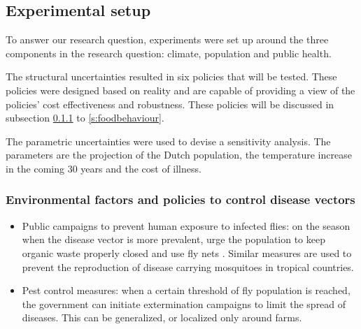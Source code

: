 \subsection{Experimental setup}
  

To answer our research question, experiments were set up around the three components in the research question: climate, population and public health. 

The structural uncertainties resulted in six policies that will be tested. These policies were designed based on reality and are capable of providing a view of the policies' cost effectiveness and robustness. These policies will be discussed in subsection \ref{s:environmentalfactors} to \ref{s:foodbehaviour}. 

The parametric uncertainties were used to devise a sensitivity analysis. The parameters are the projection of the Dutch population, the temperature increase in the coming 30 years and the cost of illness. 

\subsubsection{Environmental factors and policies to control disease vectors}
\label{s:environmentalfactors}
\begin{itemize}
    \item Public campaigns to prevent human exposure to infected flies: on the season when the disease vector is more prevalent, urge the population to keep organic waste properly closed and use fly nets \parencite{hald_use_2007}. Similar measures are used to prevent the reproduction of disease carrying mosquitoes in tropical countries. %
    \item Pest control measures: when a certain threshold of fly population is reached, the government can initiate extermination campaigns to limit the spread of diseases. This can be generalized, or localized only around farms.
\end{itemize}

